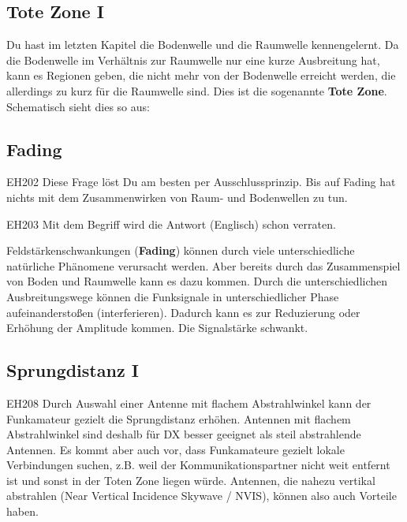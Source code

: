 \subsection{Tote Zone I}
\begin{ohmchapter}
    Du hast im letzten Kapitel die Bodenwelle und die Raumwelle kennengelernt. Da die Bodenwelle im Verhältnis zur Raumwelle nur eine kurze Ausbreitung hat, kann es Regionen geben, die nicht mehr von der Bodenwelle erreicht werden, die allerdings zu kurz für die Raumwelle sind. Dies ist die sogenannte \textbf{Tote Zone}.
    Schematisch sieht dies so aus:
\end{ohmchapter}  
\subsection{Fading}

\begin{sol}{EH202}
Diese Frage löst Du am besten per Ausschlussprinzip. Bis auf Fading hat nichts mit dem Zusammenwirken von Raum- und Bodenwellen zu tun.
\end{sol}

\begin{sol}{EH203}
Mit dem Begriff  wird die Antwort (Englisch)  schon verraten.
\end{sol}

\begin{ohmchapter}
    Feldstärkenschwankungen (\textbf{Fading}) können durch viele unterschiedliche natürliche Phänomene verursacht werden. Aber bereits durch das Zusammenspiel von Boden und Raumwelle kann es dazu kommen. Durch die unterschiedlichen Ausbreitungswege können die Funksignale in unterschiedlicher Phase aufeinanderstoßen (interferieren). Dadurch kann es zur Reduzierung oder Erhöhung der Amplitude kommen. Die Signalstärke schwankt.
\end{ohmchapter}  
\subsection{Sprungdistanz I}
\begin{sol}{EH208}
Durch Auswahl einer Antenne mit flachem Abstrahlwinkel kann der Funkamateur gezielt die Sprungdistanz erhöhen. Antennen mit flachem Abstrahlwinkel sind deshalb für DX besser geeignet als steil abstrahlende Antennen. Es kommt aber auch vor, dass Funkamateure gezielt lokale Verbindungen suchen, z.B. weil der Kommunikationspartner nicht weit entfernt ist und sonst in der Toten Zone liegen würde. Antennen, die nahezu vertikal abstrahlen (Near Vertical Incidence Skywave / NVIS), können also auch Vorteile haben.
\end{sol}
\begin{ohmchapter}
\end{ohmchapter}  
